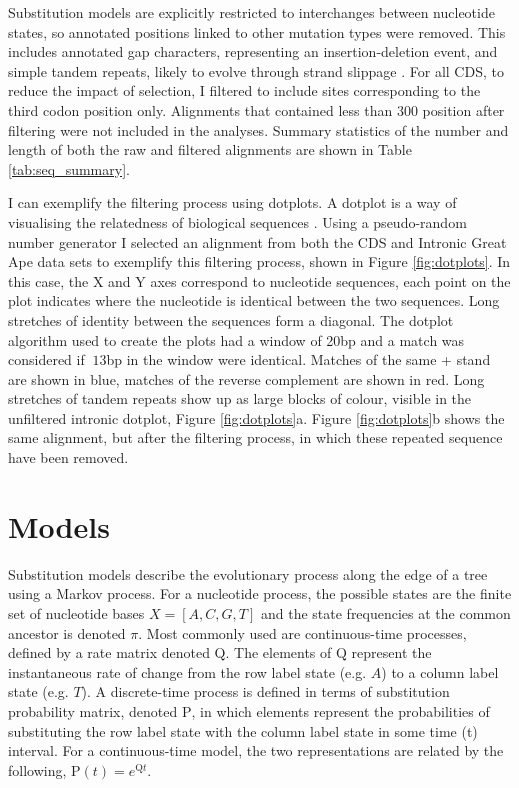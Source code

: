 Substitution models are explicitly restricted to interchanges between nucleotide states, so annotated positions linked to other mutation types were removed. This includes annotated gap characters, representing an insertion-deletion event, and simple tandem repeats, likely to evolve through strand slippage \citep{Levinson1987Slipped-strandEvolution}. For all CDS, to reduce the impact of selection, I filtered to include sites corresponding to the third codon position only. Alignments that contained less than $300$ position after filtering were not included in the analyses. Summary statistics of the number and length of both the raw and filtered alignments are shown in Table \ref{tab:seq_summary}. 



I can exemplify the filtering process using dotplots. A dotplot is a way of visualising the relatedness of biological sequences \citep{Gibbs1970TheSequences}. Using a pseudo-random number generator I selected an alignment from both the CDS and Intronic  Great Ape data sets to exemplify this filtering process, shown in Figure \ref{fig:dotplots}. In this case, the X and Y axes correspond to nucleotide sequences, each point on the plot indicates where the nucleotide is identical between the two sequences. Long stretches of identity between the sequences form a diagonal. The dotplot algorithm used to create the plots had a window of 20bp and a match was considered if $\>13$bp in the window were identical. Matches of the same + stand are shown in blue, matches of the reverse complement are shown in red. Long stretches of tandem repeats show up as large blocks of colour, visible in the unfiltered intronic dotplot, Figure \ref{fig:dotplots}a. Figure \ref{fig:dotplots}b shows the same alignment, but after the filtering process, in which these repeated sequence have been removed. 



\section{Models}

Substitution models describe the evolutionary process along the edge of a tree using a Markov process. For a nucleotide process, the possible states are the finite set of nucleotide bases $X = [A, C, G, T]$ and the state frequencies at the common ancestor is denoted $\pi$. Most commonly used are continuous-time processes, defined by a rate matrix denoted $\mathrm{Q}$. The elements of $\mathrm{Q}$ represent the instantaneous rate of change from the row label state (e.g. $A$) to a column label state (e.g. $T$). A discrete-time process is defined in terms of substitution probability matrix, denoted $\mathrm{P}$, in which elements represent the probabilities of substituting the row label state with the column label state in some time (t) interval. For a continuous-time model, the two representations are related by the following, $\mathrm{P}(t) = e^{\mathrm{Q}t}$. 


